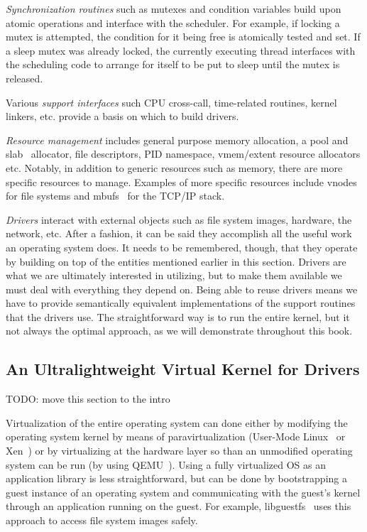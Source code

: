 \textit{Synchronization routines} such as mutexes and condition
variables build upon atomic operations and interface with the scheduler.
For example, if locking a mutex is attempted, the condition for it being
free is atomically tested and set.  If a sleep mutex was already locked,
the currently executing thread interfaces with the scheduling code to
arrange for itself to be put to sleep until the mutex is released.

Various \textit{support interfaces} such CPU cross-call, time-related
routines, kernel linkers, etc. provide a basis on which to build drivers.

\textit{Resource management} includes general purpose memory
allocation, a pool and slab~\cite{bonwick:slab} allocator, file
descriptors, PID namespace, vmem/extent resource allocators etc.
Notably, in addition to generic resources such as memory,
there are more specific resources to manage.  Examples
of more specific resources include vnodes~\cite{kleiman:vnodes} for file
systems and mbufs~\cite{stevens:tcpip2} for the TCP/IP stack.

\textit{Drivers} interact with external objects such as file
system images, hardware, the network, etc.  After a fashion, it
can be said they accomplish all the useful work an operating system
does.  It needs to be remembered, though, that they operate
by building on top of the entities mentioned earlier in this section.
Drivers are what we are ultimately interested in utilizing, but to
make them available we must deal with everything they depend on.
Being able to reuse drivers means we have to provide semantically
equivalent implementations of the support routines that the drivers use.
The straightforward way is to run the entire kernel, but it not always
the optimal approach, as we will demonstrate throughout this book.

\subsection{An Ultralightweight Virtual Kernel for Drivers}
\label{sect:conceptintro}

TODO: move this section to the intro

Virtualization of the entire operating system can done either by
modifying the operating system kernel by means of paravirtualization
(\eg User-Mode Linux~\cite{dike:uml} or Xen~\cite{barham:xen}) or by virtualizing at the
hardware layer so than an unmodified operating system can be run
(by using \eg QEMU~\cite{bellard:qemu}).
Using a fully virtualized OS as an application library is less
straightforward, but can be done by bootstrapping a guest instance
of an operating system and communicating with the guest's kernel
through an application running on the guest.  For example,
libguestfs~\cite{libguestfs} uses this approach to access file
system images safely.

